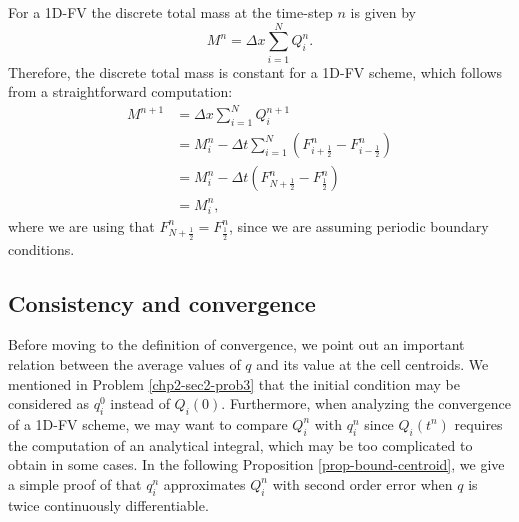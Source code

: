 For a 1D-FV the discrete total mass at the time-step $n$ is given by
\begin{equation*}
	M^n =  \Delta x \sum_{i=1}^N Q_i^n.
\end{equation*}
Therefore, the discrete total mass is constant for a 1D-FV scheme,
which follows from a straightforward computation:
\begin{align*}
	M^{n+1} &=  \Delta x \sum_{i=1}^N Q_i^{n+1} \\ 
					&= M_i^{n} - \Delta t  \sum_{i=1}^N (F^n_{i+\frac{1}{2}}- F^n_{i-\frac{1}{2}})\\
					&= M_i^{n} - \Delta t (F^n_{N+\frac{1}{2}}- F^n_{\frac{1}{2}})\\
					&= M_i^{n},
\end{align*}
where we are using that $F^n_{N+\frac{1}{2}} = F^n_{\frac{1}{2}}$, since we are assuming periodic boundary
conditions.

\subsection{Consistency and convergence}
\label{chp2-sub-CC}
Before moving to the definition of convergence, we point out an important relation
between the average values of $q$ and its value at the cell centroids.
We mentioned in Problem \ref{chp2-sec2-prob3} that the initial condition may be considered as $q_i^0$
instead of $Q_i(0)$. 
Furthermore, when analyzing the convergence of a 1D-FV scheme, we may 
want to compare $Q_i^n$ with $q_i^n$ since $Q_i(t^n)$ requires the computation of 
an analytical integral, which may be too complicated to obtain in some cases.
In the following Proposition \ref{prop-bound-centroid}, we give a simple proof
of that $q_i^n$ approximates $Q_i^n$ with second order error when $q$ is twice
continuously differentiable.

